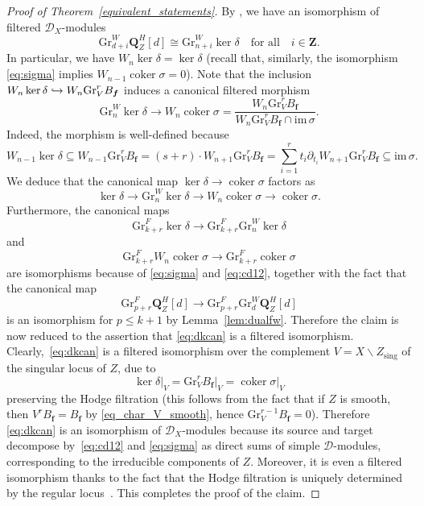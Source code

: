 \documentclass[JEP,XML,SOM,Unicode]{cedram}
\newcommand\hto{\mathrel{\lhook\joinrel\to}}
\newcommand{\DXmodules}{$\cD_X$\nobreakdash-mod\-ules\xspace}
\theoremstyle{plain}
\theoremstyle{definition}
\newcommand\Z{{\mathbf Z}}
\newcommand\Q{{\mathbf Q}}
\newcommand\cD{\mathcal{D}}
\newcommand\bff{{\boldsymbol f}}
\newcommand\gr{\mathrm{Gr}}
\newcommand\sing{\mathrm{sing}}
\DeclareMathOperator{\coker}{coker}
\begin{document}
\begin{proof}[Proof of Theorem~\ref{equivalent_statements}]
By \cite[Th.\,1.2]{CD}, we have an isomorphism of filtered \DXmodules
\begin{equation}\label{eq:cd12}
\gr^W_{d+i}\Q_Z^H[d] \cong \gr^W_{n+i}\ker\delta \quad\text{for all}\quad i\in\Z.
\end{equation}
In particular, we have $W_n\ker\delta=\ker\delta$ (recall that, similarly, the isomorphism \eqref{eq:sigma}
implies $W_{n-1}\coker\sigma=0$).
Note that the inclusion $W_n\ker\delta \hto W_n\gr^r_V B_\bff$ induces a canonical filtered morphism
\begin{equation}\label{eq:dkcan}
\gr^W_n\ker\delta \to W_n\coker\sigma=\frac{W_n\gr^r_V B_\bff}{W_n\gr^r_V B_\bff\cap \mathrm{im\,}\sigma}.
\end{equation}
Indeed, the morphism is well-defined because
\[
W_{n-1}\ker\delta \subseteq W_{n-1}\gr^r_VB_\bff=(s+r)\cdot W_{n+1}\gr^r_VB_\bff=\sum^r_{i=1} t_i\partial_{t_i}W_{n+1}\gr^r_VB_\bff \subseteq \mathrm{im\,}\sigma.
\]
We deduce that the canonical map $\ker \delta \to \coker \sigma$ factors as
\[
\ker\delta \to \gr^W_n\ker\delta \to W_n\coker\sigma \to \coker\sigma.
\]
Furthermore, the canonical maps
\[\gr^F_{k+r}\ker\delta \to \gr^F_{k+r}\gr^W_n\ker\delta\] and
\[\gr^F_{k+r}W_n\coker\sigma \to \gr^F_{k+r}\coker\sigma\] are isomorphisms because of \eqref{eq:sigma} and \eqref{eq:cd12}, together with the fact that
the canonical map
\[
\gr^F_{p+r}\Q_Z^H[d] \to\gr^F_{p+r}\gr^W_d\Q_Z^H[d]
\]
is an isomorphism for $p\leq k+1$ by Lemma~\ref{lem:dualfw}. Therefore the claim is now reduced to the
assertion that \eqref{eq:dkcan} is a filtered isomorphism. Clearly,~\eqref{eq:dkcan} is a filtered isomorphism over the complement
$V=X\smallsetminus Z_\sing$ of the singular locus of $Z$, due to
\[
\ker\delta\vert_V =\gr^r_V B_\bff\vert_V = \coker\sigma\vert_V
\]
preserving the Hodge filtration (this follows from the fact that if $Z$ is smooth, then $V^rB_{\bff}=B_{\bff}$ by \eqref{eq_char_V_smooth}, hence $\gr_V^{r-1}B_{\bff}=0$).
Therefore \eqref{eq:dkcan} is an isomorphism of \DXmodules because its source and target decompose by~\eqref{eq:cd12} and \eqref{eq:sigma}
as direct sums of simple $\cD$-modules, corresponding to the irreducible components of $Z$. Moreover, it is even a filtered isomorphism thanks to the fact that the Hodge filtration is uniquely determined by the regular locus~\cite[(3.2.2.2)]{Saito_MHP}. This completes the proof of the claim.


\end{proof}
\end{document}

